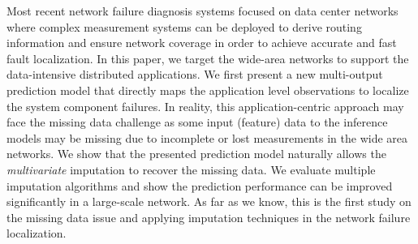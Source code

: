 Most recent network failure diagnosis systems focused on data center networks where 
complex measurement systems can be deployed to derive routing information and ensure network coverage 
in order to achieve accurate and fast fault localization. In this paper, we target the wide-area networks to 
support the data-intensive distributed applications. We first present a new multi-output prediction model 
that directly maps the application level observations to localize the system component failures. 
In reality, this application-centric approach may face the missing data challenge as some input (feature) data 
to the inference models may be missing due to incomplete or lost measurements in the wide area networks. 
We show that the presented prediction model naturally allows the {\it multivariate} imputation to recover the missing data. 
We evaluate multiple imputation algorithms and show the prediction performance can be improved significantly in 
a large-scale network. As far as we know, this is the first study on the missing data issue and applying imputation techniques 
in the network failure localization.
